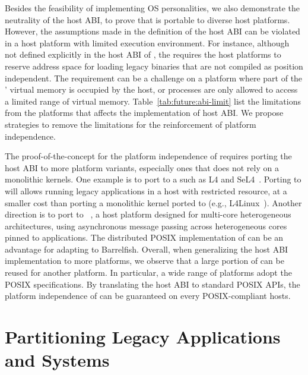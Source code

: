 Besides the feasibility of implementing OS personalities,
we also demonstrate the neutrality of the host ABI,
to prove that \graphene{} is portable to diverse host platforms.
However, the assumptions made in the definition of the host ABI
can be violated in a host platform with limited execution environment.
For instance, although not defined explicitly in the host ABI of \graphene{},
the \picoprocs{} requires the host platforms
to reserve address space for loading legacy binaries that are not compiled as position independent.
The requirement can be a challenge on a platform
where part of the \picoprocs{}' virtual memory is occupied by the host,
or processes are only allowed to access a limited range of virtual memory.
Table~\ref{tab:future:abi-limit}
list the limitations from the platforms that affects the implementation of host ABI.
We propose strategies to remove the limitations for the reinforcement of platform independence.


The proof-of-the-concept for the platform independence of \graphene{}
requires porting the host ABI to more platform variants,
especially ones that does not rely on a monolithic kernels.
One example is to port \graphene{} to a \term{\microkernel{}}
such as L4 and SeL4~\citep{l4family, klein09sel4}.
Porting \picoprocs{} to \microkernel{} will allows running legacy applications
in a host with restricted resource,
at a smaller cost than porting a monolithic kernel ported to \microkernel{}
(e.g., L4Linux~\citep{hartig97mu}).
Another direction is to port \graphene{} to ~\citep{baumann09barrelfish},
a host platform designed for multi-core heterogeneous architectures,
using asynchronous message passing across heterogeneous cores pinned to applications.
The distributed POSIX implementation of \graphene{}
can be an advantage for adapting to Barrelfish.
Overall, when generalizing the host ABI implementation to more platforms,
we observe that a large portion of \graphene{} \pal{}
can be reused for another platform.
In particular, a wide range of platforms adopt the POSIX specifications.
By translating the \graphene{} host ABI to standard POSIX APIs,
the platform independence of \graphene{} can be guaranteed on
every POSIX-compliant hosts.



\section{Partitioning Legacy Applications and Systems}



